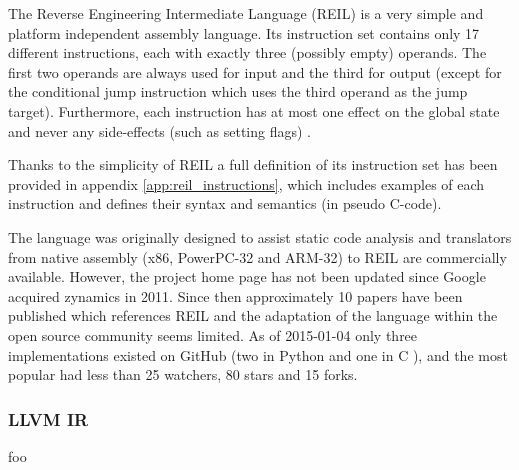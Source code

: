 The Reverse Engineering Intermediate Language (REIL) is a very simple and platform independent assembly language. Its instruction set contains only 17 different instructions, each with exactly three (possibly empty) operands. The first two operands are always used for input and the third for output (except for the conditional jump instruction which uses the third operand as the jump target). Furthermore, each instruction has at most one effect on the global state and never any side-effects (such as setting flags) \cite{reil,reil_spec}.


Thanks to the simplicity of REIL a full definition of its instruction set has been provided in appendix \ref{app:reil_instructions}, which includes examples of each instruction and defines their syntax and semantics (in pseudo C-code).


The language was originally designed to assist static code analysis and translators from native assembly (x86, PowerPC-32 and ARM-32) to REIL are commercially available. However, the project home page has not been updated since Google acquired zynamics in 2011. Since then approximately 10 papers have been published which references REIL and the adaptation of the language within the open source community seems limited. As of 2015-01-04 only three implementations existed on GitHub (two in Python \cite{barf,pyreil} and one in C \cite{bit}), and the most popular had less than 25 watchers, 80 stars and 15 forks.


\subsubsection{LLVM IR}




foo
